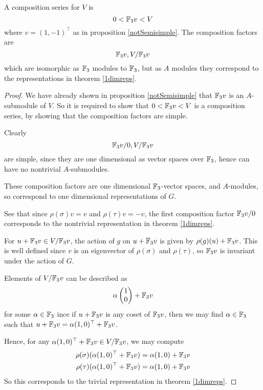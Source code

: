 \documentclass{unswmaths}
\begin{document}
\begin{proposition}
    A composition series for $V$ is 
    \begin{equation*}
        0 < {\mathbb{F}_3} v < V
    \end{equation*} 
    where $v = (1,-1)^\top$ as in proposition \ref{notSemisimple}. The composition
    factors are 
    \begin{equation*}
        {\mathbb{F}_3} v, V/{\mathbb{F}_3} v
    \end{equation*}
    which are isomorphic as ${\mathbb{F}_3}$ modules to ${\mathbb{F}_3}$, but as $A$ modules
    they correspond to the representations in theorem \ref{1dimreps}.
\end{proposition}
\begin{proof}
    We have already shown in proposition \ref{notSemisimple} that ${\mathbb{F}_3} v$ is an
    $A$-submodule of $V$. So it is required to show that $0 < {\mathbb{F}_3} v < V$ is a composition
    series, by showing that the composition factors are simple.
    
    Clearly
    \begin{equation*}
        {\mathbb{F}_3} v/0, V/{\mathbb{F}_3} v
    \end{equation*}
    are simple, since they are one dimensional as vector spaces over ${\mathbb{F}_3}$, hence
    can have no nontrivial $A$-submodules. 
    
    These composition factors are one dimensional ${\mathbb{F}_3}$-vector spaces,
    and $A$-modules, so correspond to one dimensional representations of $G$. 
   
    See that since $\rho(\sigma)v = v$ and $\rho(\tau)v = -v$, the first composition factor
    ${\mathbb{F}_3} v/0$ corresponds to the nontrivial representation in theorem \ref{1dimreps}.
    
    For $u+{\mathbb{F}_3} v \in V/{\mathbb{F}_3} v$, the action of $g$ on $u+{\mathbb{F}_3} v$ is given by
    $\rho(g)(u)+{\mathbb{F}_3} v$. This is well defined since $v$ is an eigenvector
    of $\rho(\sigma)$ and $\rho(\tau)$, so ${\mathbb{F}_3} v$ is invariant under the action of $G$.

    Elements of $V/{\mathbb{F}_3} v$ can be described as
    \begin{equation*}
        \alpha \begin{pmatrix}
            1\\0
        \end{pmatrix}
        +{\mathbb{F}_3} v
    \end{equation*} 
    for some $\alpha \in {\mathbb{F}_3}$
    ince if $u+{\mathbb{F}_3} v$ is any coset of ${\mathbb{F}_3} v$, then we may find $\alpha \in {\mathbb{F}_3}$
    such that $u+{\mathbb{F}_3} v = \alpha(1,0)^\top +{\mathbb{F}_3} v$.
    
    Hence, for any $\alpha(1,0)^\top+{\mathbb{F}_3} v \in V/{\mathbb{F}_3} v$, we may compute
    \begin{align*}
        \rho(\sigma)(\alpha(1,0)^\top+{\mathbb{F}_3} v) &= \alpha (1,0)+{\mathbb{F}_3} v\\
        \rho(\tau)(\alpha(1,0)^\top +{\mathbb{F}_3} v) &= \alpha(1,0)+{\mathbb{F}_3} v
    \end{align*}
    So this corresponds to the trivial representation in theorem \ref{1dimreps}.  
    
\end{proof}
    
\end{document}

